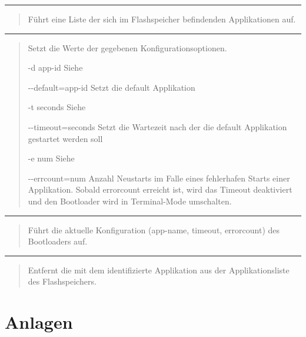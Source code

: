 \documentclass[letterpaper,10pt,ngerman]{manual}
\begin{document}
\bigskip\hrule{}\bigskip


\begin{quote}

Führt eine Liste der sich im Flashspeicher befindenden Applikationen auf.
\end{quote}


\bigskip\hrule{}\bigskip


\begin{quote}

Setzt die Werte der gegebenen Konfigurationsoptionen.
\begin{optionlist}{3cm}
\item [-d app-id]  
Siehe 
\item [-{-}default=app-id]  
Setzt die default Applikation
\item [-t seconds]  
Siehe 
\item [-{-}timeout=seconds]  
Setzt die Wartezeit nach der die default Applikation gestartet werden soll
\item [-e num]  
Siehe 
\item [-{-}errcount=num]  
Anzahl Neustarts im Falle eines fehlerhafen Starts einer Applikation.
Sobald errorcount erreicht ist, wird das Timeout deaktiviert und den Bootloader wird in Terminal-Mode umschalten.
\end{optionlist}
\end{quote}


\bigskip\hrule{}\bigskip


\begin{quote}

Führt die aktuelle Konfiguration (app-name, timeout, errorcount) des Bootloaders auf.
\end{quote}


\bigskip\hrule{}\bigskip


\begin{quote}

Entfernt die mit dem  identifizierte Applikation aus der Applikationsliste des Flashspeichers.
\end{quote}

\resetcurrentobjects
\hypertarget{--doc-appendices/index}{}

\chapter{Anlagen}
\end{document}
